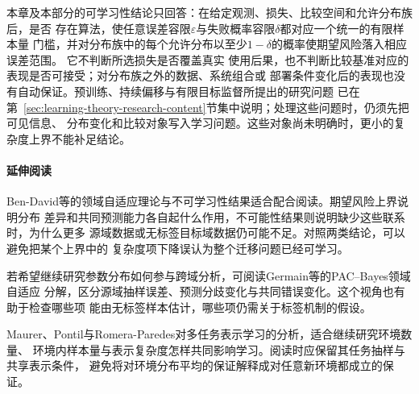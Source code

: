 本章及本部分的可学习性结论只回答：在给定观测、损失、比较空间和允许分布族后，是否
存在算法，使任意误差容限$\varepsilon$与失败概率容限$\delta$都对应一个统一的有限样本量
门槛，并对分布族中的每个允许分布以至少$1-\delta$的概率使期望风险落入相应误差范围。
它不判断所选损失是否覆盖真实
使用后果，也不判断比较基准对应的表现是否可接受；对分布族之外的数据、系统组合或
部署条件变化后的表现也没有自动保证。预训练、持续偏移与有限目标监督所提出的研究问题
已在第~\ref{sec:learning-theory-research-content}节集中说明；处理这些问题时，仍须先把可见信息、
分布变化和比较对象写入学习问题。这些对象尚未明确时，更小的复杂度上界不能补足结论。

\paragraph{延伸阅读}
Ben-David等的领域自适应理论与不可学习性结果适合配合阅读。期望风险上界说明分布
差异和共同预测能力各自起什么作用，不可能性结果则说明缺少这些联系时，为什么更多
源域数据或无标签目标域数据仍可能不足。对照两类结论，可以避免把某个上界中的
复杂度项下降误认为整个迁移问题已经可学习。

若希望继续研究参数分布如何参与跨域分析，可阅读Germain等的PAC--Bayes领域自适应
分解，区分源域抽样误差、预测分歧变化与共同错误变化。这个视角也有助于检查哪些项
能由无标签样本估计，哪些项仍需关于标签机制的假设。

Maurer、Pontil与Romera-Paredes对多任务表示学习的分析，适合继续研究环境数量、
环境内样本量与表示复杂度怎样共同影响学习。阅读时应保留其任务抽样与共享表示条件，
避免将对环境分布平均的保证解释成对任意新环境都成立的保证。
